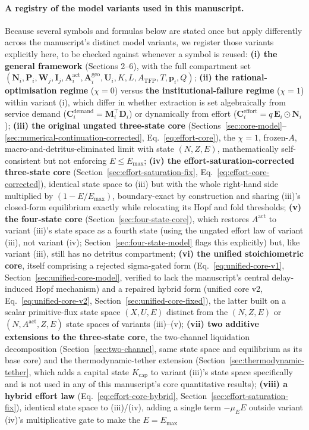 \documentclass[twocolumn,10pt]{article}
\begin{document}
\paragraph{A registry of the model variants used in this manuscript.}
\label{sec:variant-registry}
Because several symbols and formulas below are stated once but apply differently across the manuscript's distinct model variants, we register those variants explicitly here, to be checked against whenever a symbol is reused: \textbf{(i) the general framework} (Sections 2--6), with the full compartment set $(\mathbf N_i,\mathbf P_i,\mathbf W_j,\mathbf I_j,\mathbf A^{\text{act}}_i,\mathbf A^{\text{geo}}_i,\mathbf U_i,K,L,A_{\text{TFP}},T,\mathbf p_i,Q)$; \textbf{(ii) the rational-optimisation regime} ($\chi=0$) versus \textbf{the institutional-failure regime} ($\chi=1$) within variant (i), which differ in whether extraction is set algebraically from service demand ($\mathbf C_i^{\text{demand}}=\mathbf M_i^\top\mathbf D_i$) or dynamically from effort ($\mathbf C_i^{\text{effort}}=q\,\mathbf E_i\odot\mathbf N_i$); \textbf{(iii) the original ungated three-state core} (Sections~\ref{sec:core-model}--\ref{sec:numerical-continuation-corrected}, Eq.~\eqref{eq:effort-core}), the $\chi=1$, frozen-$A$, macro-and-detritus-eliminated limit with state $(N,Z,E)$, mathematically self-consistent but not enforcing $E\le E_{\max}$; \textbf{(iv) the effort-saturation-corrected three-state core} (Section~\ref{sec:effort-saturation-fix}, Eq.~\eqref{eq:effort-core-corrected}), identical state space to (iii) but with the whole right-hand side multiplied by $(1-E/E_{\max})$, boundary-exact by construction and sharing (iii)'s closed-form equilibrium exactly while relocating its Hopf and fold thresholds; \textbf{(v) the four-state core} (Section~\ref{sec:four-state-core}), which restores $A^{\text{act}}$ to variant (iii)'s state space as a fourth state (using the ungated effort law of variant (iii), not variant (iv); Section~\ref{sec:four-state-model} flags this explicitly) but, like variant (iii), still has no detritus compartment; \textbf{(vi) the unified stoichiometric core}, itself comprising a rejected sigma-gated form (Eq.~\eqref{eq:unified-core-v1}, Section~\ref{sec:unified-core-model}, verified to lack the manuscript's central delay-induced Hopf mechanism) and a repaired hybrid form (unified core v2, Eq.~\eqref{eq:unified-core-v2}, Section~\ref{sec:unified-core-fixed}), the latter built on a scalar primitive-flux state space $(X,U,E)$ distinct from the $(N,Z,E)$ or $(N,A^{\text{act}},Z,E)$ state spaces of variants (iii)--(v); \textbf{(vii) two additive extensions to the three-state core}, the two-channel liquidation decomposition (Section~\ref{sec:two-channel}, same state space and equilibrium as its base core) and the thermodynamic-tether extension (Section~\ref{sec:thermodynamic-tether}, which adds a capital state $K_{\text{cap}}$ to variant (iii)'s state space specifically and is not used in any of this manuscript's core quantitative results); \textbf{(viii) a hybrid effort law} (Eq.~\eqref{eq:effort-core-hybrid}, Section~\ref{sec:effort-saturation-fix}), identical state space to (iii)/(iv), adding a single term $-\mu_EE$ outside variant (iv)'s multiplicative gate to make the $E=E_{\max}$ 
\end{document}
